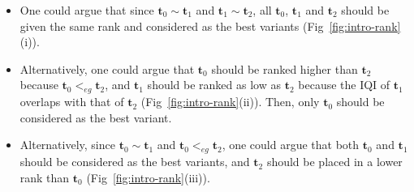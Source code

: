 \documentclass[acmsmall,screen, review]{acmart}
\begin{document}
\begin{itemize}
	\setlength\itemsep{0.1em}
	\item 
	One could argue that since $\mathbf{t}_0 \sim \mathbf{t}_1$ and $\mathbf{t}_1 \sim \mathbf{t}_2$, all $\mathbf{t}_0$, $\mathbf{t}_1$ and $\mathbf{t}_2$  should be given the same rank and considered as the best variants   (Fig~\ref{fig:intro-rank}(i)).
	
	\item Alternatively, one could argue that $\mathbf{t}_0$ should be ranked higher than $\mathbf{t}_2$ because $\mathbf{t}_0 <_{eg} \mathbf{t}_2$, and
	$\mathbf{t}_1$ should be ranked as low as $\mathbf{t}_2$ because the IQI of $\mathbf{t}_1$ overlaps with that of $\mathbf{t}_2$ (Fig~\ref{fig:intro-rank}(ii)). Then, only $\mathbf{t}_0$ should be considered as the best variant.
	
	\item Alternatively, since  $\mathbf{t}_0 \sim \mathbf{t}_1$ and $\mathbf{t}_0 <_{eg} \mathbf{t}_2$, one could argue that both $\mathbf{t}_0$ and $\mathbf{t}_1$ should be considered as the best variants, and $\mathbf{t}_2$ should be placed in a lower rank than $\mathbf{t}_0$  (Fig~\ref{fig:intro-rank}(iii)).
	 
\end{itemize}
\end{document}
